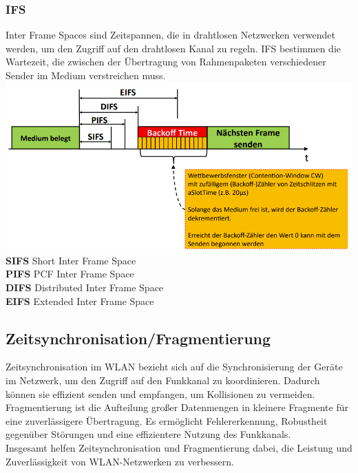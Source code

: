 \documentclass[12pt,a4paper]{article}
\begin{document}
		\subsubsection*{IFS}
		Inter Frame Spaces sind Zeitspannen, die in drahtlosen Netzwerken verwendet werden, um den Zugriff auf den drahtlosen Kanal zu regeln. IFS bestimmen die Wartezeit, die zwischen der Übertragung von Rahmenpaketen verschiedener Sender im Medium verstreichen muss.\\
		\includegraphics[width=\textwidth]{Bilder/ifs.PNG}
		\textbf{SIFS} Short Inter Frame Space\\
		\textbf{PIFS} PCF Inter Frame Space\\
		\textbf{DIFS} Distributed Inter Frame Space\\
		\textbf{EIFS} Extended Inter Frame Space \\

	\subsection{Zeitsynchronisation/Fragmentierung}
		Zeitsynchronisation im WLAN bezieht sich auf die Synchronisierung der Geräte im Netzwerk, um den Zugriff auf den Funkkanal zu koordinieren. Dadurch können sie effizient senden und empfangen, um Kollisionen zu vermeiden.\\
		Fragmentierung ist die Aufteilung großer Datenmengen in kleinere Fragmente für eine zuverlässigere Übertragung. Es ermöglicht Fehlererkennung, Robustheit gegenüber Störungen und eine effizientere Nutzung des Funkkanals.\\
		Insgesamt helfen Zeitsynchronisation und Fragmentierung dabei, die Leistung und Zuverlässigkeit von WLAN-Netzwerken zu verbessern.
\end{document}

